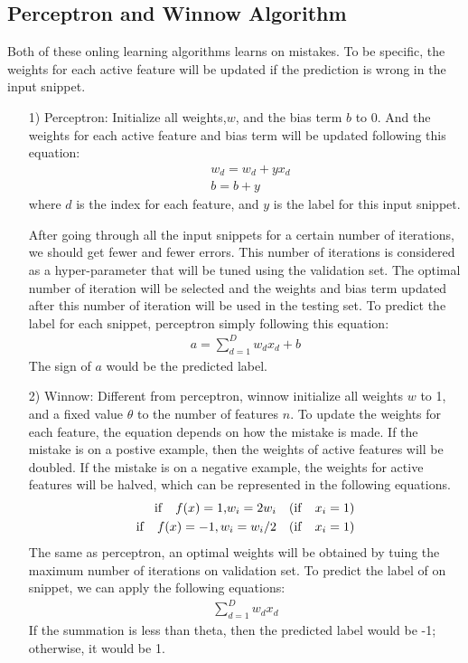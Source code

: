 \documentclass[11pt]{article}
\begin{document}
\subsection{Perceptron and Winnow Algorithm}
Both of these onling learning algorithms learns on mistakes. To be specific, the weights for each active feature will be updated if the prediction is wrong in the input snippet.
\begin{itemize}
\item[1)] Perceptron: Initialize all weights,\(w\), and the bias term \(b\) to 0. And the weights for each active feature and bias term will be updated following this equation:
\begin{align*}
&w_d = w_d + yx_d \\
&b = b + y
\end{align*}
where \(d\) is the index for each feature, and \(y\) is the label for this input snippet.

After going through all the input snippets for a certain number of iterations, we should get fewer and fewer errors. This number of iterations is considered as a hyper-parameter that will be tuned using the validation set. The optimal number of iteration will be selected and the weights and bias term updated after this number of iteration will be used in the testing set. To predict the label for each snippet, perceptron simply following this equation:
\begin{align*}
a = \sum_{d=1}^{D}w_dx_d + b
\end{align*}
The sign of \(a\) would be the predicted label.
\item[2)] Winnow: Different from perceptron, winnow initialize all weights \(w\) to 1, and a fixed value \(\theta\) to the number of features \(n\). To update the weights for each feature, the equation depends on how the mistake is made. If the mistake is on a postive example, then the weights of active features will be doubled. If the mistake is on a negative example, the weights for active features will be halved, which can be represented in the following equations. 
\begin{align*}
\mathrm{if}  \quad  f(x)=1 \text, w_i = 2w_i  \quad (\mathrm{if} \quad x_i=1)\\
\mathrm{if} \quad f(x)=-1, w_i = w_i/2  \quad (\mathrm{if} \quad x_i=1)
\end{align*}
The same as perceptron, an optimal weights will be obtained by tuing the maximum number of iterations on validation set. To predict the label of on snippet, we can apply the following equations:
\begin{align*}
\sum_{d=1}^{D}w_dx_d
\end{align*}
If the summation is less than theta, then the predicted label would be -1; otherwise, it would be 1.
\end{itemize} 
\end{document}
